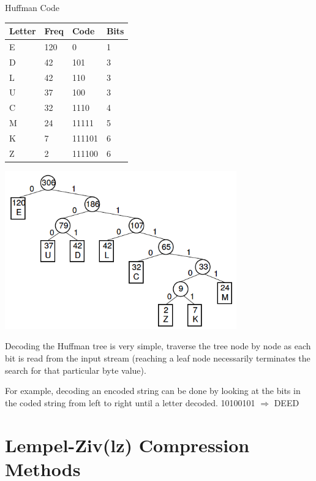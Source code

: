 \documentclass{article}
\begin{document}
Huffman Code\

\begin{flushleft}
	\setlength{\extrarowheight}{0.2cm}
	\begin{tabular}{|l|l|l|l|}
		\hline
		Letter & Freq & Code   & Bits \\ \hline
		E      & 120  & 0      & 1    \\ \hline
		D      & 42   & 101    & 3    \\ \hline
		L      & 42   & 110    & 3    \\ \hline
		U      & 37   & 100    & 3    \\ \hline
		C      & 32   & 1110   & 4    \\ \hline
		M      & 24   & 11111  & 5    \\ \hline
		K      & 7    & 111101 & 6    \\ \hline
		Z      & 2    & 111100 & 6    \\ \hline
	\end{tabular}
\end{flushleft}

\begin{center}
	\includegraphics[width=10cm]{huffman_tree}
\end{center}

Decoding the Huffman tree is very simple, traverse the tree node by node as each bit is read from the input stream (reaching a leaf node necessarily terminates the search for that particular byte value). 

For example, decoding an encoded string can be done by looking at the bits in the coded string from left to right until a letter decoded.
10100101 $\Rightarrow$ DEED

\section{Lempel-Ziv(lz) Compression Methods}
\end{document}
